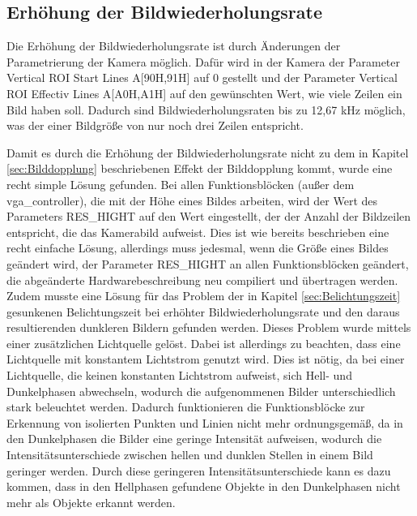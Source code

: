 \documentclass[ngerman,12pt]{article} %
\begin{document}
{\subsection{Erhöhung der Bildwiederholungsrate}
\label{sec:Erhöhung der Bildwiederholungsrate}
Die Erhöhung der Bildwiederholungsrate ist durch Änderungen der Parametrierung der Kamera möglich. Dafür wird in der Kamera der Parameter Vertical ROI Start Lines A[90H,91H] auf 0 gestellt und der Parameter Vertical ROI Effectiv Lines A[A0H,A1H] auf den gewünschten Wert, wie viele Zeilen ein Bild haben soll. Dadurch sind Bildwiederholungsraten bis zu 12,67 kHz möglich, was der einer Bildgröße von nur noch drei Zeilen entspricht.\newline

Damit es durch die Erhöhung der Bildwiederholungsrate nicht zu dem in Kapitel \ref{sec:Bilddopplung} beschriebenen Effekt der Bilddopplung kommt, wurde eine recht simple Lösung gefunden. Bei allen Funktionsblöcken (außer dem vga\_controller), die mit der Höhe eines Bildes arbeiten, wird der Wert des Parameters RES\_HIGHT auf den Wert eingestellt, der der Anzahl der Bildzeilen entspricht, die das Kamerabild aufweist. Dies ist wie bereits beschrieben eine recht einfache Lösung, allerdings muss jedesmal, wenn die Größe eines Bildes geändert wird, der Parameter RES\_HIGHT an allen Funktionsblöcken geändert, die abgeänderte Hardwarebeschreibung neu compiliert und übertragen werden.\\
Zudem musste eine Lösung für das Problem der in Kapitel \ref{sec:Belichtungszeit} gesunkenen Belichtungszeit bei erhöhter Bildwiederholungsrate und den daraus resultierenden dunkleren Bildern gefunden werden. Dieses Problem wurde mittels einer zusätzlichen Lichtquelle gelöst. Dabei ist allerdings zu beachten, dass eine Lichtquelle mit konstantem Lichtstrom genutzt wird. Dies ist nötig, da bei einer Lichtquelle, die keinen konstanten Lichtstrom aufweist, sich Hell- und Dunkelphasen abwechseln, wodurch die aufgenommenen Bilder unterschiedlich stark beleuchtet werden. Dadurch funktionieren die Funktionsblöcke zur Erkennung von isolierten Punkten und Linien nicht mehr ordnungsgemäß, da in den Dunkelphasen die Bilder eine geringe Intensität aufweisen, wodurch die Intensitätsunterschiede zwischen hellen und dunklen Stellen in einem Bild geringer werden. Durch diese geringeren Intensitätsunterschiede kann es dazu kommen, dass in den Hellphasen gefundene Objekte in den Dunkelphasen nicht mehr als Objekte erkannt werden.
\clearpage





}
\end{document}
